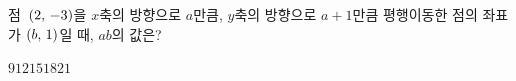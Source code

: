 점~$(2,\mkern3mu -3)$을 $x$축의 방향으로 $a$만큼, $y$축의 방향으로 $a+1$만큼 평행이동한 점의 좌표가 $(b,\mkern3mu 1)$일 때, $ab$의 값은?
\begin{choices32}{$9$}{$12$}{$15$}{$18$}{$21$}\end{choices32}
